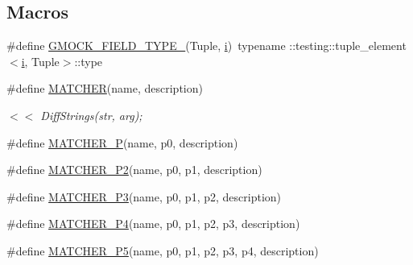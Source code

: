 \subsection*{Macros}
\begin{DoxyCompactItemize}
\item 
\#define \mbox{\hyperlink{_obj__test_2lib_2googletest-release-1_88_81_2googlemock_2include_2gmock_2gmock-generated-matchers_8h_acf3e27de83a73f0d873da1cd471e505b}{G\+M\+O\+C\+K\+\_\+\+F\+I\+E\+L\+D\+\_\+\+T\+Y\+P\+E\+\_\+}}(Tuple,  \mbox{\hyperlink{_obj__test_2lib_2googletest-master_2googlemock_2test_2gmock-matchers__test_8cc_acb559820d9ca11295b4500f179ef6392}{i}})~typename \+::testing\+::tuple\+\_\+element$<$\mbox{\hyperlink{_obj__test_2lib_2googletest-master_2googlemock_2test_2gmock-matchers__test_8cc_acb559820d9ca11295b4500f179ef6392}{i}}, Tuple$>$\+::type
\item 
\#define \mbox{\hyperlink{_obj__test_2lib_2googletest-release-1_88_81_2googlemock_2include_2gmock_2gmock-generated-matchers_8h_af4fe73ff8e2b0494f4970b575b65ddff}{M\+A\+T\+C\+H\+ER}}(name,  description)
\begin{DoxyCompactList}\small\item\em $<$$<$ Diff\+Strings(str, arg); \end{DoxyCompactList}\item 
\#define \mbox{\hyperlink{_obj__test_2lib_2googletest-release-1_88_81_2googlemock_2include_2gmock_2gmock-generated-matchers_8h_acb7ae915efa2fd8d3f6ea7313198afb6}{M\+A\+T\+C\+H\+E\+R\+\_\+P}}(name,  p0,  description)
\item 
\#define \mbox{\hyperlink{_obj__test_2lib_2googletest-release-1_88_81_2googlemock_2include_2gmock_2gmock-generated-matchers_8h_a78efce3ad21c8f68223f5c2d09f2e79d}{M\+A\+T\+C\+H\+E\+R\+\_\+\+P2}}(name,  p0,  p1,  description)
\item 
\#define \mbox{\hyperlink{_obj__test_2lib_2googletest-release-1_88_81_2googlemock_2include_2gmock_2gmock-generated-matchers_8h_a507103c6251f8bf4393ec119d9e34d34}{M\+A\+T\+C\+H\+E\+R\+\_\+\+P3}}(name,  p0,  p1,  p2,  description)
\item 
\#define \mbox{\hyperlink{_obj__test_2lib_2googletest-release-1_88_81_2googlemock_2include_2gmock_2gmock-generated-matchers_8h_a6ec420ed6bc3ad073f19a4e32dd1f38f}{M\+A\+T\+C\+H\+E\+R\+\_\+\+P4}}(name,  p0,  p1,  p2,  p3,  description)
\item 
\#define \mbox{\hyperlink{_obj__test_2lib_2googletest-release-1_88_81_2googlemock_2include_2gmock_2gmock-generated-matchers_8h_a3a9589cd79e2dbdb4e09981510c9c42e}{M\+A\+T\+C\+H\+E\+R\+\_\+\+P5}}(name,  p0,  p1,  p2,  p3,  p4,  description)

\end{DoxyCompactItemize}

